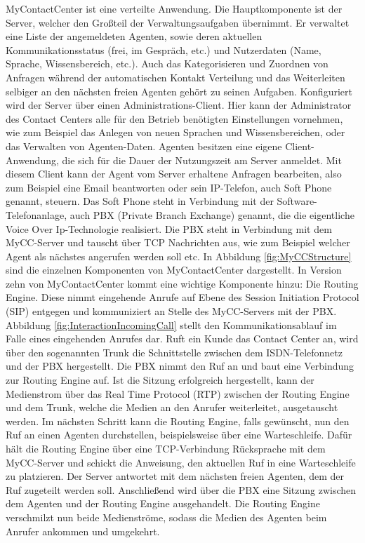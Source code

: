 MyContactCenter ist eine verteilte Anwendung. Die Hauptkomponente ist der Server, welcher den Großteil der Verwaltungsaufgaben übernimmt. Er verwaltet eine Liste der angemeldeten Agenten, sowie deren aktuellen Kommunikationsstatus (frei, im Gespräch, etc.) und Nutzerdaten (Name, Sprache, Wissensbereich, etc.). Auch das Kategorisieren und Zuordnen von Anfragen während der automatischen Kontakt Verteilung und das Weiterleiten selbiger an den nächsten freien Agenten gehört zu seinen Aufgaben. Konfiguriert wird der Server über einen Administrations-Client. Hier kann der Administrator des Contact Centers alle für den Betrieb benötigten Einstellungen vornehmen, wie zum Beispiel das Anlegen von neuen Sprachen und Wissensbereichen, oder das Verwalten von Agenten-Daten. Agenten besitzen eine eigene Client-Anwendung, die sich für die Dauer der Nutzungszeit am Server anmeldet.  Mit diesem Client kann der Agent vom Server erhaltene Anfragen bearbeiten, also zum Beispiel eine Email beantworten oder sein IP-Telefon, auch Soft Phone genannt, steuern. Das Soft Phone steht in Verbindung mit der Software-Telefonanlage, auch PBX (Private Branch Exchange) genannt, die die eigentliche Voice Over Ip-Technologie realisiert. Die PBX steht in Verbindung mit dem MyCC-Server und tauscht über TCP Nachrichten aus, wie zum Beispiel welcher Agent als nächstes angerufen werden soll etc. In Abbildung \ref{fig:MyCCStructure} sind die einzelnen Komponenten von MyContactCenter dargestellt.
\newline
In Version zehn von MyContactCenter kommt eine wichtige Komponente hinzu: Die Routing Engine. Diese nimmt eingehende Anrufe auf Ebene des Session Initiation Protocol (SIP) entgegen und kommuniziert an Stelle des MyCC-Servers mit der PBX. Abbildung \ref{fig:InteractionIncomingCall} stellt den Kommunikationsablauf im Falle eines eingehenden Anrufes dar. Ruft ein Kunde das Contact Center an, wird über den sogenannten Trunk die Schnittstelle zwischen dem ISDN-Telefonnetz und der PBX hergestellt. Die PBX nimmt den Ruf an und baut eine Verbindung zur Routing Engine auf. Ist die Sitzung erfolgreich hergestellt, kann der Medienstrom über das Real Time Protocol (RTP) zwischen der Routing Engine und dem Trunk, welche die Medien an den Anrufer weiterleitet, ausgetauscht werden. Im nächsten Schritt kann die Routing Engine, falls gewünscht, nun den Ruf an einen Agenten durchstellen, beispielsweise über eine Warteschleife. Dafür hält die Routing Engine über eine TCP-Verbindung Rücksprache mit dem MyCC-Server und schickt die Anweisung, den aktuellen Ruf in eine Warteschleife zu platzieren. Der Server antwortet mit dem nächsten freien Agenten, dem der Ruf zugeteilt werden soll. Anschließend wird über die PBX eine Sitzung zwischen dem Agenten und der Routing Engine ausgehandelt. Die Routing Engine verschmilzt nun beide Medienströme, sodass die Medien des Agenten beim Anrufer ankommen und umgekehrt. 
